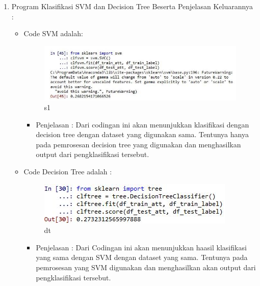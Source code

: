 \begin{enumerate}
\begin{itemize}
\end{itemize}

\par
\par
\item Program Klasifikasi SVM dan Decision Tree Beserta Penjelasan Keluarannya :
\begin{itemize}
\item Code SVM adalah:
\par
\begin{figure}[ht]
\centering
\includegraphics[scale=0.2]{figures/s1.jpg}
\caption{s1}
\label{contoh}
\end{figure}
\par
\begin{itemize}
\item Penjelasan : Dari codingan ini akan menunjukkan klasifikasi dengan decision tree dengan dataset yang digunakan sama. Tentunya hanya pada pemrosesan decision tree yang digunakan dan menghasilkan output dari pengklasifikasi tersebut.
\par 
\par
\end{itemize}
\item Code Decision Tree adalah :
\par
\begin{figure}[ht]
\centering
\includegraphics[scale=0.2]{figures/dt1.jpg}
\caption{dt}
\label{contoh}
\end{figure}
\par
\begin{itemize}
\item Penjelasan : Dari Codingan ini akan menunjukkan haasil klasifikasi yang sama  dengan SVM dengan dataset yang sama. Tentunya pada pemrosesan yang SVM digunakan dan menghasilkan akan output dari pengklasifikasi tersebut.
\par
\par
\end{itemize}
\end{itemize}




\end{enumerate}
